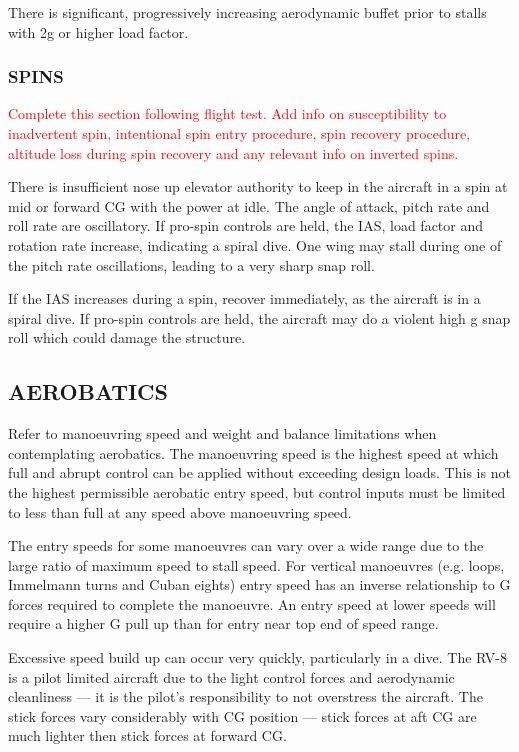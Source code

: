 There is significant, progressively increasing aerodynamic buffet prior to stalls with 2g or higher load factor.

\subsubsection{SPINS}\textcolor{red}{Complete this section following flight test. Add info on susceptibility to inadvertent spin, intentional spin entry procedure, spin recovery procedure, altitude loss during spin recovery and any relevant info on inverted spins.}

There is insufficient nose up elevator authority to keep in the aircraft in a spin at mid or forward CG with the power at idle. The angle of attack, pitch rate and roll rate are oscillatory. If pro-spin controls are held, the IAS, load factor and rotation rate increase, indicating a spiral dive. One wing may stall during one of the pitch rate oscillations, leading to a very sharp snap roll.

\begin{Note}[Caution]
If the IAS increases during a spin, recover immediately, as the aircraft is in a spiral dive. If pro-spin controls are held, the aircraft may do a violent high g snap roll which could damage the structure. 
\end{Note}

\subsection{AEROBATICS}

Refer to manoeuvring speed and weight and balance limitations when
contemplating aerobatics. The manoeuvring speed is the highest speed at
which full and abrupt control can be applied without exceeding design
loads. This is not the highest permissible aerobatic entry speed, but
control inputs must be limited to less than full at any speed above
manoeuvring speed.

The entry speeds for some manoeuvres can vary over a wide range due
to the large ratio of maximum speed to stall speed. For vertical manoeuvres
(e.g. loops, Immelmann turns and Cuban eights) entry speed has
an inverse relationship to G forces required to complete the manoeuvre.
An entry speed at lower speeds will require a higher G pull up than
for entry near top end of speed range. 

\begin{Note}[WARNING]
Excessive speed build up can occur very quickly, particularly in a
dive. The RV-8 is a pilot limited aircraft due to the light control
forces and aerodynamic cleanliness --- it is the pilot's responsibility
 to not overstress the aircraft. The stick forces vary considerably
with CG position --- stick forces at aft CG are much lighter then stick
forces at forward CG.
\end{Note}


